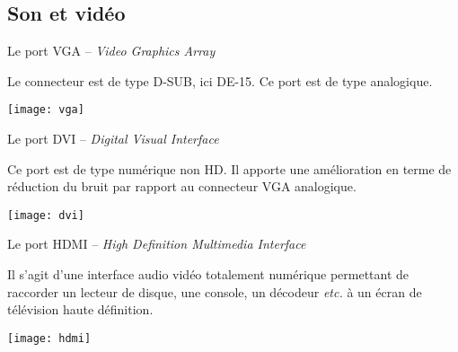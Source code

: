 \subsection{Son et vidéo}




\begin{minipage}[c]{.85\linewidth}
Le port VGA -- \textit{Video Graphics Array}

Le connecteur est de type D-SUB, ici DE-15. Ce port est de type analogique.

\end{minipage} \hfill
\begin{minipage}[c]{.14\linewidth}
\begin{center}
\texttt{[image: vga]}
\end{center}
\end{minipage}


\begin{minipage}[c]{.85\linewidth}
Le port DVI -- \textit{Digital Visual Interface}

Ce port est de type numérique non HD. Il apporte une amélioration en terme de réduction du bruit par rapport au connecteur VGA analogique.
\end{minipage} \hfill
\begin{minipage}[c]{.14\linewidth}
\begin{center}
\texttt{[image: dvi]}
\end{center}
\end{minipage}


\begin{minipage}[c]{.85\linewidth}
Le port HDMI -- \textit{High Definition Multimedia Interface}

Il s'agit d'une interface audio vidéo totalement numérique permettant de raccorder un lecteur de disque, une console, un décodeur \textit{etc.} à un écran de télévision haute définition.
\end{minipage} \hfill
\begin{minipage}[c]{.14\linewidth}
\begin{center}
\texttt{[image: hdmi]}
\end{center}
\end{minipage}







